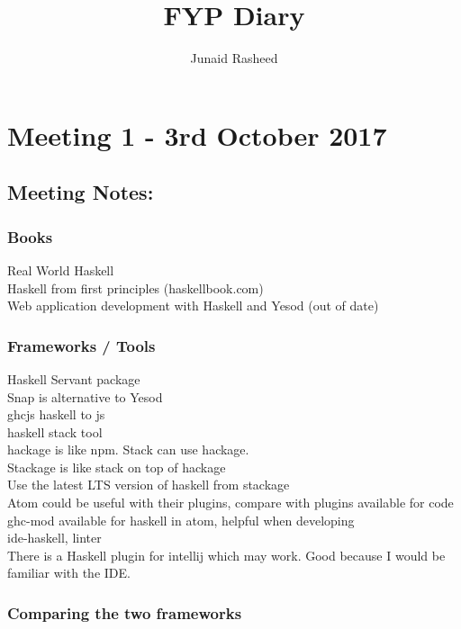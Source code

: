 \documentclass[a4paper,11pt]{article}
\title{FYP Diary}
\author{Junaid Rasheed}
\date{}
\begin{document}
\maketitle
\tableofcontents
\newpage

\section{Meeting 1 - 3rd October 2017}

\subsection{Meeting Notes:}

\subsubsection{Books}

Real World Haskell\\
Haskell from first principles (haskellbook.com)\\
Web application development with Haskell and Yesod (out of date)

\subsubsection{Frameworks / Tools}

Haskell Servant package\\
Snap is alternative to Yesod\\
ghcjs haskell to js\\
haskell stack tool\\
hackage is like npm. Stack can use hackage.\\
Stackage is like stack on top of hackage\\
Use the latest LTS version of haskell from stackage\\
Atom could be useful with their plugins, compare with plugins available for code\\
ghc-mod available for haskell in atom, helpful when developing\\
ide-haskell, linter\\
There is a Haskell plugin for intellij which may work. Good because I would be familiar with the IDE.

\subsubsection{Comparing the two frameworks}
\end{document}
